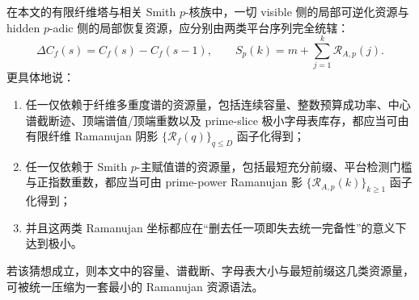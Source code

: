 \begin{conjecture}\label{conj:conclusion-ramanujan-resource-duality}
在本文的有限纤维塔与相关 Smith \(p\)-核族中，一切 visible 侧的局部可逆化资源与 hidden \(p\)-adic 侧的局部恢复资源，应分别由两类平台序列完全统辖：
\[
\Delta C_f(s)=C_f(s)-C_f(s-1),
\qquad
S_p(k)=m+\sum_{j=1}^{k}\mathcal R_{A,p}(j).
\]
更具体地说：
\begin{enumerate}
  \item 任一仅依赖于纤维多重度谱的资源量，包括连续容量、整数预算成功率、中心谱截断迹、顶端谱值/顶端重数以及 prime-slice 极小字母表库存，都应当可由有限纤维 Ramanujan 阴影 \(\{\mathscr R_f(q)\}_{q\le D}\) 函子化得到；
  \item 任一仅依赖于 Smith \(p\)-主赋值谱的资源量，包括最短充分前缀、平台检测门槛与正指数重数，都应当可由 prime-power Ramanujan 影 \(\{\mathcal R_{A,p}(k)\}_{k\ge 1}\) 函子化得到；
  \item 并且这两类 Ramanujan 坐标都应在“删去任一项即失去统一完备性”的意义下达到极小。
\end{enumerate}
若该猜想成立，则本文中的容量、谱截断、字母表大小与最短前缀这几类资源量，可被统一压缩为一套最小的 Ramanujan 资源语法。
\end{conjecture}
